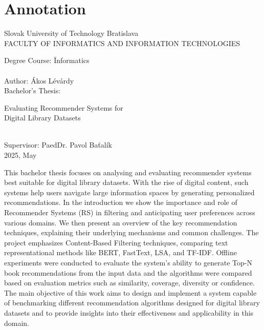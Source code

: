\documentclass[\myFontSize,a4paper,oneside,hidelinks]{article}
\begin{document}
\newpage{} 
\thispagestyle{empty}
\section*{Annotation}
\begin{minipage}[t]{\columnwidth}%
Slovak University of Technology Bratislava\\
%
\textsc{\large FACULTY OF INFORMATICS AND INFORMATION TECHNOLOGIES}
%
\begin{tabbing}
Degree Course: \hspace{2.5em} \=Informatics\\\\
%
Author: \> Ákos Lévárdy\\	%
Bachelor's Thesis: \> \parbox[t]{0.6\textwidth}{Evaluating Recommender Systems for\\Digital Library Datasets}\\
Supervisor: \> PaedDr. Pavol Baťalík\\
2025, May
\end{tabbing}
\end{minipage}
\bigskip{}

This bachelor thesis focuses on analysing and evaluating recommender systems best suitable for digital library datasets. With the rise of digital content, such systems help users navigate large information spaces by generating personalized recommendations. In the introduction we show the importance and role of Recommender Systems (RS) in filtering and anticipating user preferences across various domains. We then present an overview of the key recommendation techniques, explaining their underlying mechanisms and common challenges. The project emphasizes Content-Based Filtering techniques, comparing text representational methods like BERT, FastText, LSA, and TF-IDF. 
Offline experiments were conducted to evaluate the system’s ability to generate Top-N book recommendations from the input data and the algorithms were compared based on evaluation metrics such as similarity, coverage, diversity or confidence. 
The main objective of this work aims to design and implement a system capable of benchmarking different recommendation algorithms designed for digital library datasets and to provide insights into their effectiveness and applicability in this domain.


\newpage{}
\thispagestyle{empty}
\end{document}
